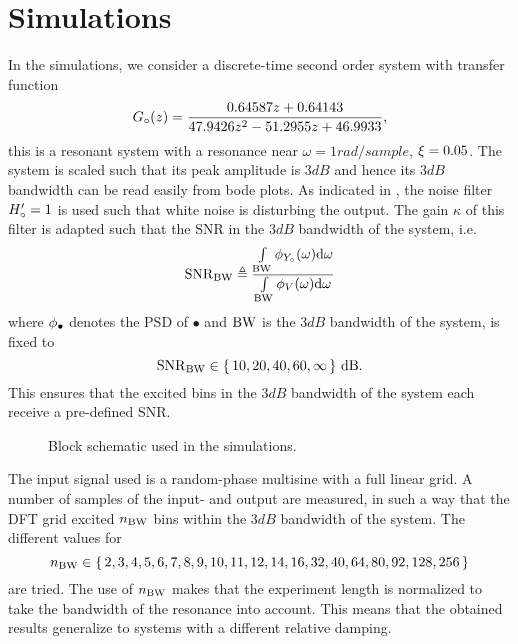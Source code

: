 \section{Simulations}
\label{sec:simulations}

In the simulations, we consider a discrete-time second order system with transfer function
\begin{equation}
{G}_{\circ}(z) = \frac{0.64587 z + 0.64143}
                                      {47.9426 z^2 - 51.2955 z + 46.9933}
                                      \text{,}
\end{equation}
this is a resonant system with a resonance near $\omega=1\unit{rad/sample}$, $\xi_{}=0.05$.
The system is scaled such that its peak amplitude is $3\unit{dB}$ and hence its $3\unit{dB}$ bandwidth can be read easily from bode plots.
As indicated in , the noise filter ${H}_{\circ}' = 1$ is used such that white noise is disturbing the output.
The gain $\kappa$ of this filter is adapted such that the \gls{SNR} in the $3\unit{dB}$ bandwidth of the system, i.e.
\begin{equation}
  \mathrm{SNR}_{\mathrm{BW}} \triangleq
  \frac{\int\limits_{\mathrm{BW}} \phi_{{Y}_{\circ}}(\omega) \mathrm{d}\omega}
            {\int\limits_{\mathrm{BW}} \phi_{V}(\omega) \mathrm{d}{\omega}}
\end{equation}
where $\phi_{\bullet}$ denotes the \gls{PSD} of $\bullet$ and $\mathrm{BW}$ is the $3 \unit{dB}$ bandwidth of the system, is fixed to \[
\mathrm{SNR}_{\mathrm{BW}} \in \set{10, 20, 40, 60, \infty} \,\mathrm{dB}\text{.}
\]
This ensures that the excited bins in the $3\unit{dB}$ bandwidth of the system each receive a pre-defined \gls{SNR}.

\begin{figure}
 \centering
  
  \caption{Block schematic used in the simulations. }
  \label{fig:nparam:blockH0}
\end{figure}

The input signal used is a random-phase multisine with a full linear grid.
A number of samples of the input- and output are measured, in such a way that the \gls{DFT} grid excited $n_{\mathrm{BW}}$ bins within the $3\unit{dB}$ bandwidth of the system.
The different values for 
\[n_{\mathrm{BW}} \in \set{2, 3, 4, 5, 6, 7, 8, 9, 10, 11, 12, 14, 16, 32, 40, 64, 80, 92, 128, 256}\] are tried. 
The use of $n_{\mathrm{BW}}$ makes that the experiment length is normalized to take the bandwidth of the resonance into account.
This means that the obtained results generalize to systems with a different relative damping.

